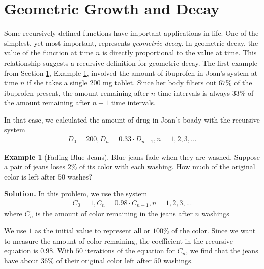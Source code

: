 \documentclass[10pt,]{book}
\theoremstyle{plain}
\theoremstyle{definition}
\theoremstyle{definition}
\newtheorem{example}[theorem]{Example}
\theoremstyle{definition}
\numberwithin{equation}{section}
\begin{document}
\section[{Geometric Growth and Decay}]{Geometric Growth and Decay}\label{chapter04-section03}
\hypertarget{p-67}{}%
Some recursively defined functions have important applications in life.  One of the simplest, yet most important, represents \emph{geometric decay}. In geometric decay, the value of the function at time \(n\) is directly proportional to the value at time. This relationship suggests a recursive definition for geometric decay. The first example from Section \hyperref[chapter04-section01]{1}, Example \hyperref[ibuprofen-example-one-dose]{1}, involved the amount of ibuprofen in Joan's system at time \(n\) if she takes a single \(200\) mg tablet. Since her body filters out \(67\%\) of the ibuprofen present, the amount remaining after \(n\) time intervals is always \(33\%\) of the amount remaining after \(n-1\) time intervals.%
\par
\hypertarget{p-68}{}%
In that case, we calculated the amount of drug in Joan's boady with the recursive system%
%
\begin{gather*}
D_0=200, D_n=0.33 \cdot D_{n-1}, n=1,2,3,...
\end{gather*}
\begin{example}[Fading Blue Jeans]\label{example-fading-blue-jeans}
\hypertarget{p-69}{}%
Blue jeans fade when they are washed. Suppose a pair of jeans loses \(2\%\) of its color with each washing.  How much of the original color is left after \(50\) washes?%
\par\smallskip%
\noindent\textbf{Solution.}\hypertarget{solution-4}{}\quad%
\hypertarget{p-70}{}%
In this problem, we use the system%
%
\begin{gather*}
C_0=1, C_n=0.98 \cdot C_{n-1}, n=1,2,3,...
\end{gather*}
\hypertarget{p-71}{}%
where \(C_n\) is the amount of color remaining in the jeans after \(n\) washings%
\par
\hypertarget{p-72}{}%
We use \(1\) as the initial value to represent all or \(100\%\) of the color.  Since we want to measure the amount of color remaining, the coefficient in the recursive equation is \(0.98\).  With \(50\) iterations of the equation for \(C_n\), we find that the jeans have about \(36\%\) of their original color left after \(50\) washings.%
\end{example}
\end{document}
